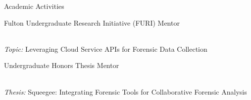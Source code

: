 
\begin{rSection}{Academic Activities}

  \begin{rBulletSubsection}{Fulton Undergraduate Research Initiative (FURI) Mentor}

    \item {}\\
    \emph{Topic:} Leveraging Cloud Service APIs for Forensic Data Collection

  \end{rBulletSubsection}

  \begin{rBulletSubsection}{Undergraduate Honors Thesis Mentor}

    \item {}\\%
    \emph{Thesis:} Squeegee: Integrating Forensic Tools for Collaborative Forensic Analysis

  \end{rBulletSubsection}

\end{rSection}

